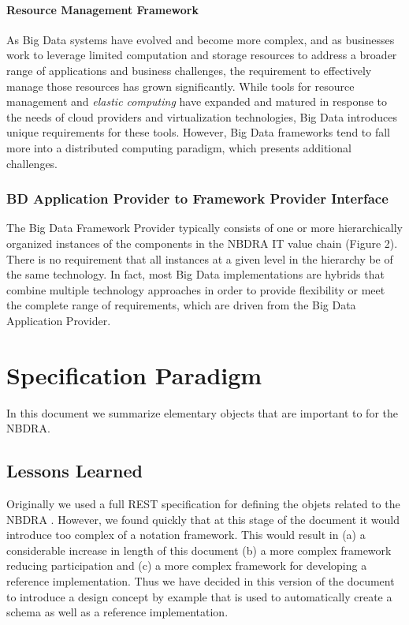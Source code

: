 \documentclass[10pt]{article}
\begin{document}
\paragraph{Resource Management Framework}

As Big Data systems have evolved and become more complex, and as
businesses work to leverage limited computation and storage resources
to address a broader range of applications and business challenges,
the requirement to effectively manage those resources has grown
significantly. While tools for resource management and {\it elastic
computing} have expanded and matured in response to the needs of cloud
providers and virtualization technologies, Big Data introduces unique
requirements for these tools. However, Big Data frameworks tend to
fall more into a distributed computing paradigm, which presents
additional challenges.

\subsubsection{BD Application Provider to Framework Provider
  Interface}\label{S:r-app-provider}

The Big Data Framework Provider typically consists of one or more
hierarchically organized instances of the components in the NBDRA IT
value chain (Figure 2). There is no requirement that all instances at
a given level in the hierarchy be of the same technology. In fact,
most Big Data implementations are hybrids that combine multiple
technology approaches in order to provide flexibility or meet the
complete range of requirements, which are driven from the Big Data
Application Provider.


	
\section{Specification Paradigm}

In this document we summarize elementary objects that are important to
for the NBDRA.

\subsection{Lessons Learned}

Originally we used a full REST specification for defining the objets
related to the NBDRA \cite{cloudmesh-nist}. However, we found quickly
that at this stage of the document it would introduce too complex of a
notation framework.  This would result in (a) a considerable increase
in length of this document (b) a more complex framework reducing
participation and (c) a more complex framework for developing a
reference implementation. Thus we have decided in this version of the
document to introduce a design concept by example that is used to
automatically create a schema as well as a reference implementation.
\end{document}
